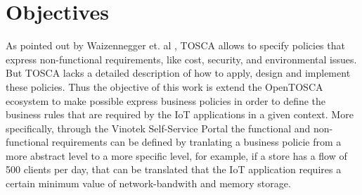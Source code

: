 \section{Objectives}
\label{sec:Objectives}
As pointed out by Waizennegger et. al \cite{waizenegger2013policy4tosca}, TOSCA allows to specify policies that express non-functional requirements,
like cost, security, and environmental issues. But TOSCA lacks a detailed description of how to apply, design and implement these policies.
Thus the objective of this work is extend the OpenTOSCA ecosystem to make possible express business policies in order to define the business rules
that are required by the IoT applications in a given context. More specifically, through the Vinotek Self-Service Portal the functional and
non-functional requirements can be defined by tranlating a business policie from a more abstract level to a more specific level, for example, if a store
has a flow of 500 clients per day, that can be translated that the IoT application requires a certain minimum value of network-bandwith and memory storage. 
